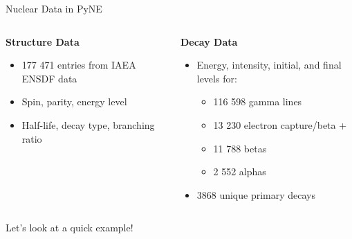 \documentclass[xcolor=x11names,compress]{beamer}
\renewcommand{\(}{\begin{columns}}
\renewcommand{\)}{\end{columns}}
\newcommand{\<}[1]{\begin{column}{#1}}
\renewcommand{\>}{\end{column}}
\begin{document}
\begin{frame}{Nuclear Data in PyNE}

	\begin{columns}[T]
  	\begin{column}{0.45\textwidth}
  	    \begin{center}
  	    \textbf{Structure Data}
  	    \end{center}
        \begin{itemize}
          \item 177 471 entries from IAEA ENSDF data
          \item Spin, parity, energy level
          \item Half-life, decay type, branching ratio
        \end{itemize}
  	\end{column}
 	\begin{column}{0.45\textwidth}
        \begin{center}
  	    \textbf{Decay Data}
  	    \end{center}
        \begin{itemize}
          \item Energy, intensity, initial, and final levels for:
          \begin{itemize}
            \item 116 598 gamma lines
            \item 13 230 electron capture/beta +
            \item 11 788 betas
            \item 2 552 alphas
          \end{itemize}
          \item 3868 unique primary decays
        \end{itemize}
  	\end{column}
	\end{columns}

    \vspace*{1 em}
    Let's look at a \alert{quick example}!

\end{frame}
\end{document}

